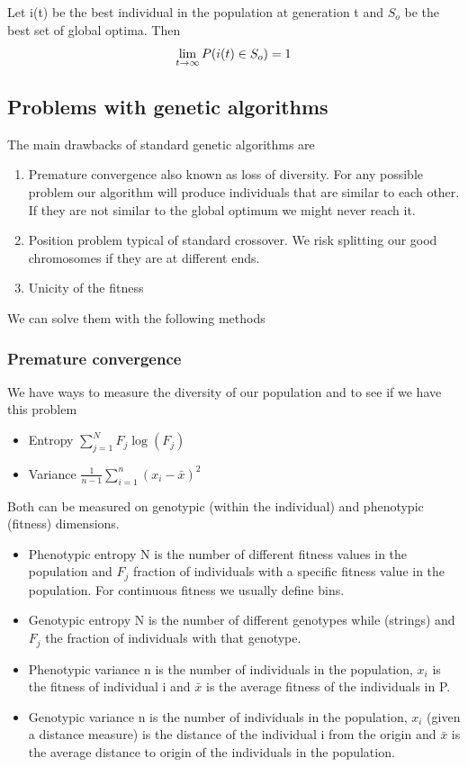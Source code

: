 Let i(t) be the best individual in the population at generation t and $S_o$ be the best set of global optima. Then \[\lim_{t\rightarrow \infty} P(i(t) \in S_o) = 1\]

\subsection{Problems with genetic algorithms}

The main drawbacks of standard genetic algorithms are

\begin{enumerate}
    \item Premature convergence \ra also known as loss of diversity. For any possible problem our algorithm will produce individuals that are similar to each other. If they are not similar to the global optimum we might never reach it. 
    \item Position problem \ra typical of standard crossover. We risk splitting our good chromosomes if they are at different ends. 
    \item Unicity of the fitness
\end{enumerate}


We can solve them with the following methods

\subsubsection{Premature convergence}

We have ways to measure the diversity of our population and to see if we have this problem

\begin{itemize}
    \item Entropy \ra $\sum_{j = 1}^{N} F_j \log(F_j)$
    \item Variance \ra  $\frac{1}{n-1} \sum_{i=1}^{n} (x_i - \bar{x})^2$
\end{itemize}

Both can be measured on genotypic (within the individual) and phenotypic (fitness) dimensions. 

\begin{itemize}
    \item Phenotypic entropy \ra N is the number of different fitness values in the population and $F_j$ fraction of individuals with a specific fitness value in the population. For continuous fitness we usually define bins. 
    \item Genotypic entropy \ra N is the number of different genotypes while (strings) and $F_j$ the fraction of individuals with that genotype. 
    \item Phenotypic variance \ra n is the number of individuals in the population, $x_i$ is the fitness of individual i and $\bar{x}$ is the average fitness of the individuals in P. 
    \item Genotypic variance \ra n is the number of individuals in the population, $x_i$ (given a distance measure) is the distance of the individual i from the origin and $\bar{x}$ is the average distance to origin of the individuals in the population. 
\end{itemize}

